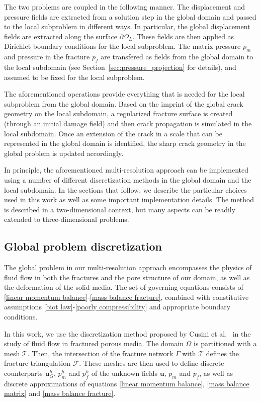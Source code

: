 The two problems are coupled in the following manner.  The displacement and pressure fields are extracted from a solution step in the global domain and passed to the local subproblem in different ways.  In particular, the global displacement fields are extracted along the surface $\partial\Omega_L$. These fields are then  applied as Dirichlet boundary conditions for the local subproblem.  The matrix pressure $p_m$ and pressure in the fracture $p_f$ are transfered as fields from the global domain to the local subdomain (see Section~\ref{sec:pressure_projection} for details), and assumed to be fixed for the local subproblem.   

The aforementioned operations provide everything that is needed for the local subproblem from the global domain.  Based on the imprint of the global crack geometry on the local subdomain, a regularized fracture surface is created (through an initial damage field) and then crack propagation is simulated in the local subdomain. Once an extension of the crack in a scale that can be represented in the global domain is identified, the sharp crack geometry in the global problem is updated accordingly.  

In principle, the aforementioned multi-resolution approach can be implemented using a number of different discretization methods in the global domain and the local subdomain.  In the sections that follow, we describe the particular choices used in this work as well as some important implementation details.  The method is described in a two-dimensional context, but many aspects can be readily extended to three-dimensional problems.  

\subsection{Global problem discretization}
\label{sec:global_disc}

The global problem in our multi-resolution approach encompasses the physics of fluid flow in both the fractures and the pore structure of our domain, as well as the deformation of the solid media. The set of governing equations consists of  \eqref{linear momentum balance}-\eqref{mass balance fracture}, combined with constitutive assumptions \eqref{biot law}-\eqref{poorly compressibility} and appropriate boundary conditions. 

In this work, we use the discretization method proposed by Cusini et al.\ \cite{cusini2021simulation} in the study of fluid flow in fractured porous media. 
The  domain $\Omega$ is partitioned with a  mesh $\mathcal{T}$. Then, the intersection of the fracture network $\Gamma$ with $\mathcal{T}$ defines the fracture triangulation $\mathcal{F}$. These meshes are then used to define discrete counterparts $\textbf{u}^h_G$, $p_m^h$ and $p_f^h$ of the unknown fields $\textbf{u}$, $p_m$ and $p_f$, as well as discrete approximations of equations  \eqref{linear momentum balance}, \eqref{mass balance matrix} and \eqref{mass balance fracture}.

